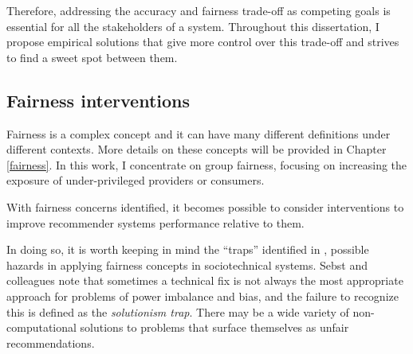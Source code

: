 




Therefore, addressing the accuracy and fairness trade-off as competing goals is essential for all the stakeholders of a system. Throughout this dissertation, I propose empirical solutions that give more control over this trade-off and strives to find a sweet spot between them. 


\subsection{Fairness interventions}

Fairness is a complex concept and it can have many different definitions under different contexts. More details on these concepts will be provided in Chapter \ref{fairness}. In this work, I concentrate on group fairness, focusing on increasing the exposure of under-privileged providers or consumers. 

With fairness concerns identified, it becomes possible to consider interventions to improve recommender systems performance relative to them. 

In doing so, it is worth keeping in mind the ``traps'' identified in \cite{selbst2019fairness}, possible hazards in applying fairness concepts in sociotechnical systems. Sebst and colleagues note that sometimes a technical fix is not always the most appropriate approach for problems of power imbalance and bias, and the failure to recognize this is defined as the \textit{solutionism trap}. There may be a wide variety of non-computational solutions to problems that surface themselves as unfair recommendations. 

